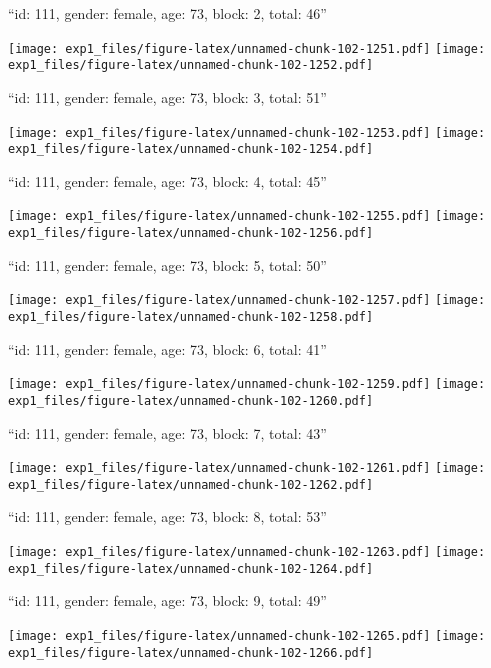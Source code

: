 \documentclass[11pt,,]{article}
\begin{document}
\newpage
[1] 

``id: 111, gender: female, age: 73, block: 2, total: 46''

\texttt{[image: exp1\_files/figure-latex/unnamed-chunk-102-1251.pdf]}
\texttt{[image: exp1\_files/figure-latex/unnamed-chunk-102-1252.pdf]}

\newpage
[1] 

``id: 111, gender: female, age: 73, block: 3, total: 51''

\texttt{[image: exp1\_files/figure-latex/unnamed-chunk-102-1253.pdf]}
\texttt{[image: exp1\_files/figure-latex/unnamed-chunk-102-1254.pdf]}

\newpage
[1] 

``id: 111, gender: female, age: 73, block: 4, total: 45''

\texttt{[image: exp1\_files/figure-latex/unnamed-chunk-102-1255.pdf]}
\texttt{[image: exp1\_files/figure-latex/unnamed-chunk-102-1256.pdf]}

\newpage
[1] 

``id: 111, gender: female, age: 73, block: 5, total: 50''

\texttt{[image: exp1\_files/figure-latex/unnamed-chunk-102-1257.pdf]}
\texttt{[image: exp1\_files/figure-latex/unnamed-chunk-102-1258.pdf]}

\newpage
[1] 

``id: 111, gender: female, age: 73, block: 6, total: 41''

\texttt{[image: exp1\_files/figure-latex/unnamed-chunk-102-1259.pdf]}
\texttt{[image: exp1\_files/figure-latex/unnamed-chunk-102-1260.pdf]}

\newpage
[1] 

``id: 111, gender: female, age: 73, block: 7, total: 43''

\texttt{[image: exp1\_files/figure-latex/unnamed-chunk-102-1261.pdf]}
\texttt{[image: exp1\_files/figure-latex/unnamed-chunk-102-1262.pdf]}

\newpage
[1] 

``id: 111, gender: female, age: 73, block: 8, total: 53''

\texttt{[image: exp1\_files/figure-latex/unnamed-chunk-102-1263.pdf]}
\texttt{[image: exp1\_files/figure-latex/unnamed-chunk-102-1264.pdf]}

\newpage
[1] 

``id: 111, gender: female, age: 73, block: 9, total: 49''

\texttt{[image: exp1\_files/figure-latex/unnamed-chunk-102-1265.pdf]}
\texttt{[image: exp1\_files/figure-latex/unnamed-chunk-102-1266.pdf]}
\end{document}
